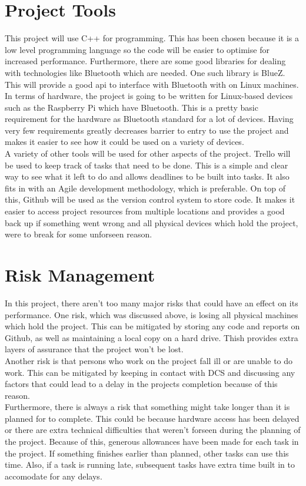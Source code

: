 \documentclass{report}
\begin{document}
\section*{Project Tools}

This project will use C++ for programming. This has been chosen because it is a low level programming language 
so the code will be easier to optimise for increased performance. Furthermore, there are some good libraries 
for dealing with technologies like Bluetooth which are needed. One such library is BlueZ\cite{bluez}. This will 
provide a good api to interface with Bluetooth with on Linux machines.
\bigskip\\
In terms of hardware, the project is going to be written for Linux-based devices such as the Raspberry Pi which have 
Bluetooth. This is a pretty basic requirement for the hardware as Bluetooth standard for a lot of devices. Having 
very few requirements greatly decreases barrier to entry to use the project and makes it easier to see how it could 
be used on a variety of devices. 
\bigskip\\
A variety of other tools will be used for other aspects of the project. Trello will be used to keep track of tasks that 
need to be done. This is a simple and clear way to see what it left to do and allows deadlines to be built into tasks. It 
also fits in with an Agile development methodology, which is preferable. On top of this, Github will be used as the version 
control system to store code. It makes it easier to access project resources from multiple locations and provides a good back 
up if something went wrong and all physical devices which hold the project, were to break for some unforseen reason. 

\section*{Risk Management}

In this project, there aren't too many major risks that could have an effect on its performance. One risk, which was discussed 
above, is losing all physical machines which hold the project. This can be mitigated by storing any code and reports on Github, 
as well as maintaining a local copy on a hard drive. Thish provides extra layers of assurance that the project won't be lost. 
\bigskip\\
Another risk is that persons who work on the project fall ill or are unable to do work. This can be mitigated by keeping in 
contact with DCS and discussing any factors that could lead to a delay in the projects completion because of this reason.
\bigskip\\
Furthermore, there is always a risk that something might take longer than it is planned for to complete. This could be because hardware 
access has been delayed or there are extra technical difficulties that weren't forseen during the planning of the project. Because of this, 
generous allowances have been made for each task in the project. If something finishes earlier than planned, other tasks can use this time. 
Also, if a task is running late, subsequent tasks have extra time built in to accomodate for any delays.
\end{document}
